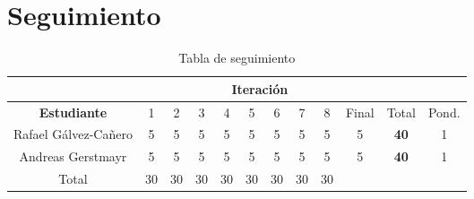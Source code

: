 \section{Seguimiento}

\begin{table}[htdp]
\begin{center}
\begin{tabular}{|c|c|c|c|c|c|c|c|c|c|c|c|}
\cline{2-10}
\multicolumn{1}{c}{}&\multicolumn{9}{|c|}{\textbf{Iteración}}&\multicolumn{2}{c}{}\\
\hline
\textbf{Estudiante}&1&2&3&4&5&6&7&8&Final&Total&Pond.\\
\hline
Rafael Gálvez-Cañero&5&5&5&5&5&5&5&5&5&\textbf{40}&1\\
Andreas Gerstmayr&5&5&5&5&5&5&5&5&5&\textbf{40}&1\\
\hline
Total&30&30&30&30&30&30&30&30&\multicolumn{2}{c}{}\\
\cline{1-9}
\end{tabular}
\end{center}
\caption{Tabla de seguimiento}
\label{tab:seguimiento}
\end{table}%
